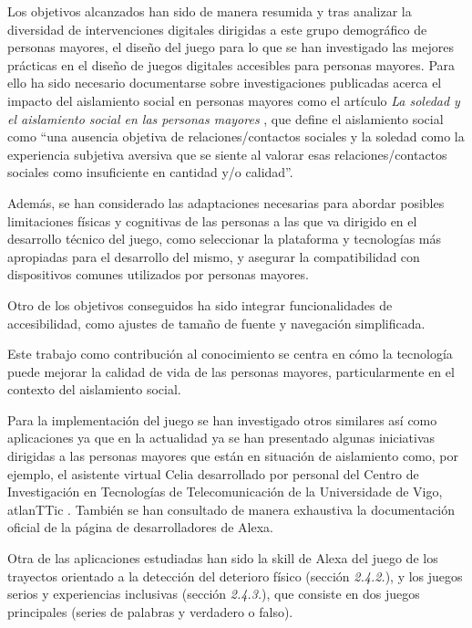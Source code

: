 Los objetivos alcanzados han sido de manera resumida y tras analizar la diversidad de intervenciones digitales dirigidas a este grupo demográfico de personas mayores, el diseño del juego para lo que se han investigado las mejores prácticas en el diseño de juegos digitales accesibles para personas mayores. Para ello ha sido necesario documentarse sobre investigaciones publicadas acerca el impacto del aislamiento social en personas mayores como el artículo \textit{La soledad y el aislamiento social en las personas mayores} \parencite{ArruebarrenaCabaco2020}, que define el aislamiento social como \enquote{una ausencia objetiva de relaciones/contactos sociales y la soledad como la experiencia subjetiva aversiva que se siente al valorar esas relaciones/contactos sociales como insuficiente en cantidad y/o calidad}.

Además, se han considerado las adaptaciones necesarias para abordar posibles limitaciones físicas y cognitivas de las personas a las que va dirigido en el desarrollo técnico del juego, como seleccionar la plataforma y tecnologías más apropiadas para el desarrollo del mismo, y asegurar la compatibilidad con dispositivos comunes utilizados por personas mayores.

Otro de los objetivos conseguidos ha sido integrar funcionalidades de accesibilidad, como ajustes de tamaño de fuente y navegación simplificada.

Este trabajo como contribución al conocimiento se centra en cómo la tecnología puede mejorar la calidad de vida de las personas mayores, particularmente en el contexto del aislamiento social.

Para la implementación del juego se han investigado otros similares así como aplicaciones ya que en la actualidad ya se han presentado algunas iniciativas dirigidas a las personas mayores que están en situación de aislamiento como, por ejemplo, el asistente virtual Celia desarrollado por personal del Centro de Investigación en Tecnologías de Telecomunicación de la Universidade de Vigo, atlanTTic \parencite{celia-app}. También se han consultado de manera exhaustiva la documentación oficial de la página de desarrolladores de Alexa.

Otra de las aplicaciones estudiadas han sido la skill de Alexa del juego de los trayectos orientado a la detección del deterioro físico (sección \textit{2.4.2.}), y los juegos serios y experiencias inclusivas (sección \textit{2.4.3.}), que consiste en dos juegos principales (series de palabras y verdadero o falso).

